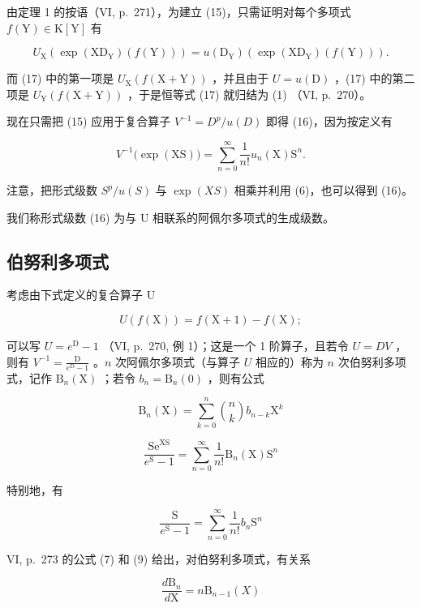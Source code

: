 由定理 1 的按语（VI, p.~271），为建立 (15)，只需证明对每个多项式 \(f(\mathrm{Y}) \in \mathrm{K}[\mathrm{Y}]\) 有

\[
U _ {\mathrm{X}} \left(\exp (\mathrm{XD} _ {\mathrm{Y}}) (f (\mathrm{Y}))\right) = u (\mathrm{D} _ {\mathrm{Y}}) \left(\exp (\mathrm{XD} _ {\mathrm{Y}}) (f (\mathrm{Y}))\right).\tag{17}
\]

而 (17) 中的第一项是 \(U_{\mathrm{X}}(f(\mathrm{X} + \mathrm{Y}))\) ，并且由于 \(U = u(\mathrm{D})\) ，(17) 中的第二项是 \(U_{\mathrm{Y}}(f(\mathrm{X} + \mathrm{Y}))\) ，于是恒等式 (17) 就归结为 (1) （VI, p.~270）。

现在只需把 (15) 应用于复合算子 \(V^{-1} = D^{p}/u(D)\) 即得 (16)，因为按定义有

\[
V ^ {- 1} \big (\exp (\mathrm{XS}) \big) = \sum_ {n = 0} ^ {\infty} \frac {1}{n !} u _ {n} (\mathrm{X}) \mathrm{S} ^ {n}.
\]

注意，把形式级数 \(S^{p}/u(S)\) 与 \(\exp(XS)\) 相乘并利用 (6)，也可以得到 (16)。

我们称形式级数 (16) 为与 U 相联系的阿佩尔多项式的生成级数。

\subsection{伯努利多项式}

考虑由下式定义的复合算子 U

\[
U (f (\mathrm{X})) = f (\mathrm{X} + 1) - f (\mathrm{X});
\]

可以写 \(U = e^{\mathrm{D}} - 1\) （VI, p.~270, 例 1）；这是一个 1 阶算子，且若令 \(U = DV\) ，则有 \(V^{-1} = \frac{\mathrm{D}}{e^{\mathrm{D}} - 1}\) 。\(n\) 次阿佩尔多项式（与算子 \(U\) 相应的）称为 \(n\) 次伯努利多项式，记作 \(\mathrm{B}_n(\mathrm{X})\) ；若令 \(b_n = \mathrm{B}_n(0)\) ，则有公式

\[
\mathrm{B} _ {n} (\mathrm{X}) = \sum_ {k = 0} ^ {n} \binom{n}{k} b _ {n - k} \mathrm{X} ^ {k}\tag{18}
\]

\[
\frac {\mathrm{Se} ^ {\mathrm{XS}}}{e ^ {\mathrm{S}} - 1} = \sum_ {n = 0} ^ {\infty} \frac {1}{n !} \mathrm{B} _ {n} (\mathrm{X}) \mathrm{S} ^ {n}\tag{19}
\]

特别地，有

\[
{\frac {\mathrm{S}}{e ^ {\mathrm{S}} - 1}} = \sum_ {n = 0} ^ {\infty} {\frac {1}{n !}} b _ {n} \mathrm{S} ^ {n}\tag{20}
\]

VI, p.~273 的公式 (7) 和 (9) 给出，对伯努利多项式，有关系

\[
\frac {d \mathrm{B} _ {n}}{d \mathrm{X}} = n \mathrm{B} _ {n - 1} (X)\tag{21}
\]

